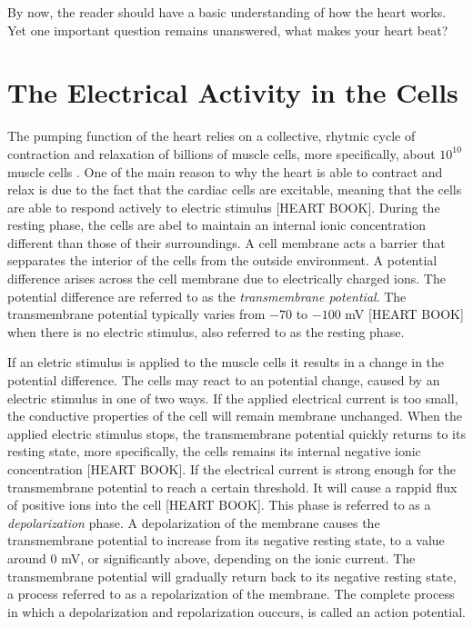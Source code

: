 By now, the reader should have a basic understanding of how the heart works. Yet one important question remains unanswered, what makes your heart beat?

\section{The Electrical Activity in the Cells}
The pumping function of the heart relies on a collective, rhytmic cycle of contraction and relaxation of billions of muscle cells, more specifically, about \(10^{10}\) muscle cells \cite{article23}. One of the main reason to why the heart is able to contract and relax is due to the fact that the cardiac cells are excitable, meaning that the cells are able to respond actively to electric stimulus [HEART BOOK]. During the resting phase, the cells are abel to maintain an internal ionic concentration different than those of their surroundings. A cell membrane acts a barrier that sepparates the interior of the cells from the outside environment. A potential difference arises across the cell membrane due to electrically charged ions. The potential difference are referred to as the \textit{transmembrane potential}. The transmembrane potential typically varies from \(-70\) to \(-100\) mV [HEART BOOK] when there is no electric stimulus, also referred to as the resting phase. 

If an eletric stimulus is applied to the muscle cells it results in a change in the potential difference. The cells may react to an potential change, caused by an electric stimulus in one of two ways. If the applied electrical current is too small, the conductive properties of the cell will remain membrane unchanged. When the applied electric stimulus stops, the transmembrane potential quickly returns to its resting state, more specifically, the cells remains its internal negative ionic concentration [HEART BOOK]. If the electrical current is strong enough for the transmembrane potential to reach a certain threshold. It will cause a rappid flux of positive ions into the cell [HEART BOOK]. This phase is referred to as a \textit{depolarization} phase. A depolarization of the membrane causes the transmembrane potential to increase from its negative resting state, to a value around \(0\) mV, or significantly above, depending on the ionic current. The transmembrane potential will gradually return back to its negative resting state, a process referred to as a repolarization of the membrane. The complete process in which a depolarization and repolarization ouccurs, is called an action potential. 


